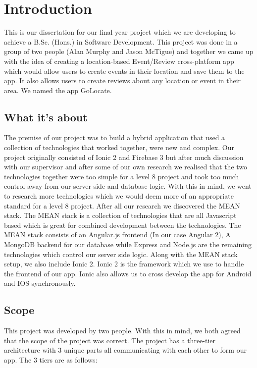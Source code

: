 \chapter{Introduction}
This is our dissertation for our final year project which we are developing to achieve a B.Sc. (Hons.) in Software Development. This project was done in a group of two people (Alan Murphy and Jason McTigue) and together we came up with the idea of creating a location-based Event/Review cross-platform app which would allow users to create events in their location and save them to the app. It also allows users to create reviews about any location or event in their area. We named the app GoLocate.

\section {What it’s about}
The premise of our project was to build a hybrid application that used a collection of technologies that worked together, were new and complex. Our project originally consisted of Ionic 2 and Firebase 3 but after much discussion with our supervisor and after some of our own research we realised that the two technologies together were too simple for a level 8 project and took too much control away from our server side and database logic. With this in mind, we went to research more technologies which we would deem more of an appropriate standard for a level 8 project. After all our research we discovered the MEAN stack\cite{Mean-Stack}. The MEAN stack is a collection of technologies that are all Javascript based which is great for combined development between the technologies. The MEAN stack consists of an Angular.js frontend (In our case Angular 2), A MongoDB backend for our database while Express and Node.js are the remaining technologies which control our server side logic. Along with the MEAN stack setup, we also include Ionic 2. Ionic 2 is the framework which we use to handle the frontend of our app. Ionic also allows us to cross develop the app for Android and IOS synchronously.

\section{Scope}
This project was developed by two people. With this in mind, we both agreed that the scope of the project was correct. The project has a three-tier architecture with 3 unique parts all communicating with each other to form our app. The 3 tiers are as follows:

